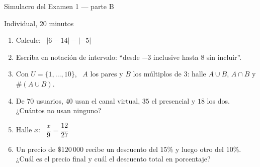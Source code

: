 \documentclass[aspectratio=169,10pt]{beamer}
\begin{document}
\begin{frame}{Simulacro del Examen 1 — parte B}
  \begin{alertblock}{Individual, 20 minutos}
    \scriptsize
    \begin{enumerate}\setlength{\itemsep}{0.0cm}
      \setcounter{enumi}{6}
      \item Calcule: \ $|6-14| - |-5|$
      \item Escriba en notación de intervalo: ``desde $-3$ inclusive hasta
            $8$ sin incluir''.
      \item Con $U=\{1,\dots,10\}$, \ $A$ los pares y $B$ los múltiplos de
            $3$: halle $A\cup B$, $A\cap B$ y $\#(A\cup B)$.
      \item De $70$ usuarios, $40$ usan el canal virtual, $35$ el
            presencial y $18$ los dos. ¿Cuántos no usan ninguno?
      \item Halle $x$: \ $\dfrac{x}{9}=\dfrac{12}{27}$
      \item Un precio de $\$120\,000$ recibe un descuento del $15\%$ y luego
            otro del $10\%$. ¿Cuál es el precio final y cuál el descuento
            total en porcentaje?
    \end{enumerate}
  \end{alertblock}
\end{frame}
\end{document}
